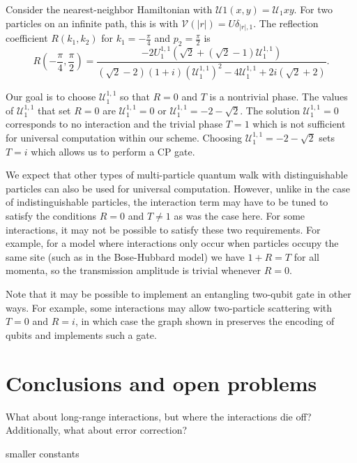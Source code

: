 \documentclass[../thesis-main/thesis-main]{subfiles}
\begin{document}
Consider the nearest-neighbor Hamiltonian with $\mathcal{U}{1}(x,y) = \mathcal{U}_{1}xy$. For two particles on an infinite path, this is  with $\mathcal{V}(|r|)=U\delta_{|r|,1}$. The reflection coefficient $R(k_1,k_2)$  for $k_1=-\frac{\pi}{4}$ and $p_2 = \frac{\pi}{2}$ is
\[
  R\left(-\frac{\pi}{4},\frac{\pi}{2}\right) =\frac{-2U_{1}^{1,1}\left(\sqrt{2}+(\sqrt{2}-1)\mathcal{U}_{1}^{1,1}\right)}{(\sqrt{2} - 2)(1+i) (\mathcal{U}_{1}^{1,1})^2 - 4 \mathcal{U}_{1}^{1,1} + 2 i (\sqrt{2} + 2)}.
\]

Our goal is to choose $\mathcal{U}_{1}^{1,1}$ so that $R=0$ and $T$ is a nontrivial phase. The values of $\mathcal{U}_{1}^{1,1}$ that set $R=0$ are  $\mathcal{U}_{1}^{1,1} = 0$ or $\mathcal{U}_{1}^{1,1} = -2 - \sqrt{2}$.  The solution $\mathcal{U}_{1}^{1,1} = 0$ corresponds to no interaction and the trivial phase $T = 1$ which is not sufficient for universal computation within our scheme. Choosing $\mathcal{U}_{1}^{1,1}=-2-\sqrt{2}$ sets $T= i$ which allows us to perform a CP gate. 

We expect that other types of multi-particle quantum walk with distinguishable particles can also be used for universal computation. However, unlike in the case of indistinguishable particles, the interaction term may have to be tuned to satisfy the conditions $R=0$ and $T\neq1$  as was the case here.  For some interactions, it may not be possible to satisfy these two requirements.  For example, for a model where interactions only occur when particles occupy the same site (such as in the Bose-Hubbard model) we have $1+R = T$ for all momenta, so the transmission amplitude is trivial whenever $R=0$.

Note that it may be possible to implement an entangling two-qubit gate in other ways.  For example, some interactions may allow two-particle scattering with $T=0$ and $R=i$, in which case the graph shown in  preserves the encoding of qubits and implements such a gate.

\section{Conclusions and open problems}

What about long-range interactions, but where the interactions die off?
Additionally, what about error correction?

smaller constants

\biblio{}
\end{document}
